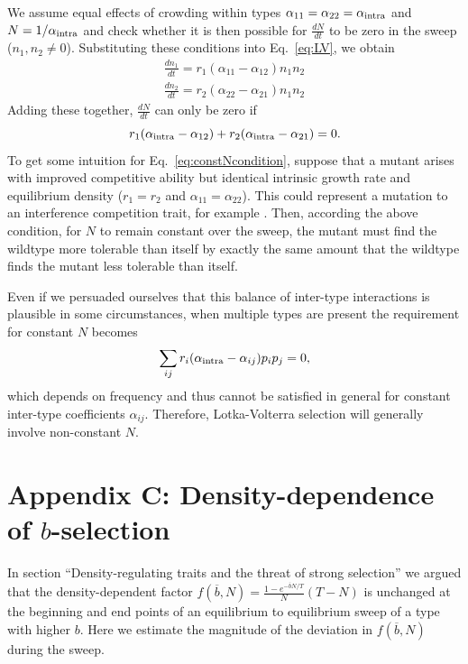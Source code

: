 \documentclass[12pt]{article}
\begin{document}
We assume equal effects of crowding within types $\alpha_{11}=\alpha_{22}=\alpha_{\rm intra}$ and $N=1/\alpha_{\rm intra}$ and check whether it is then possible for $\frac{dN}{dt}$ to be zero in the sweep ($n_1,n_2 \neq 0$). Substituting these conditions into Eq.~\eqref{eq:LV}, we obtain 
\begin{align}
\frac{d n_1}{dt} = r_1(\alpha_{11}-\alpha_{12})n_1n_2 \nonumber\\
\frac{d n_2}{dt} = r_2(\alpha_{22}-\alpha_{21})n_1n_2
\end{align}
Adding these together, $\frac{dN}{dt}$ can only be zero if 
\begin{equation}
r_1(\alpha_{\rm intra}-\alpha_{12})+r_2(\alpha_{\rm intra}-\alpha_{21})=0. \label{eq:constNcondition}
\end{equation}
To get some intuition for Eq.~\eqref{eq:constNcondition}, suppose that a mutant arises with improved competitive ability but identical intrinsic growth rate and equilibrium density ($r_1=r_2$ and $\alpha_{11}=\alpha_{22}$). This could represent a mutation to an interference competition trait, for example \citep{gill_1974}. Then, according the above condition, for $N$ to remain constant over the sweep, the mutant must find the wildtype more tolerable than itself by exactly the same amount that the wildtype finds the mutant less tolerable than itself. 

Even if we persuaded ourselves that this balance of inter-type interactions is plausible in some circumstances, when multiple types are present the requirement for constant $N$ becomes
\begin{equation}
\sum_{ij}r_i(\alpha_{\rm intra}-\alpha_{ij})p_ip_j=0,
\end{equation}
which depends on frequency and thus cannot be satisfied in general for constant inter-type coefficients $\alpha_{ij}$. Therefore, Lotka-Volterra selection will generally involve non-constant $N$.

\section*{Appendix C: Density-dependence of $b$-selection}

In section ``Density-regulating traits and the threat of strong selection'' we argued that the density-dependent factor $f(\overline{b},N)=\frac{1-e^{-\overline{b}N/T}}{N}(T-N)$ is unchanged at the beginning and end points of an equilibrium to equilibrium sweep of a type with higher $b$. Here we estimate the magnitude of the deviation in $f(\overline{b},N)$ during the sweep. 
\end{document}
